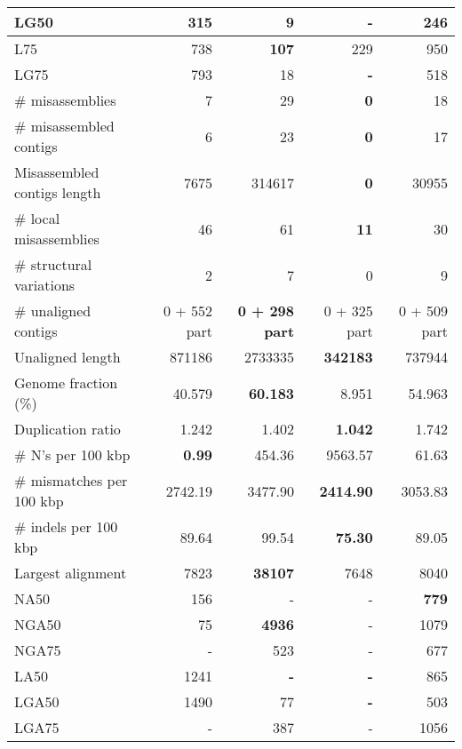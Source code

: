 \documentclass[12pt,a4paper]{article}
\begin{document}
\begin{table}[ht]
\begin{center}
\begin{tabular}{|l*{4}{|r}|}
LG50 & 315 & 9 & {\bf -} & 246 \\ \hline
L75 & 738 & {\bf 107} & 229 & 950 \\ \hline
LG75 & 793 & 18 & {\bf -} & 518 \\ \hline
\# misassemblies & 7 & 29 & {\bf 0} & 18 \\ \hline
\# misassembled contigs & 6 & 23 & {\bf 0} & 17 \\ \hline
Misassembled contigs length & 7675 & 314617 & {\bf 0} & 30955 \\ \hline
\# local misassemblies & 46 & 61 & {\bf 11} & 30 \\ \hline
\# structural variations & 2 & 7 & 0 & 9 \\ \hline
\# unaligned contigs & 0 + 552 part & {\bf 0 + 298 part} & 0 + 325 part & 0 + 509 part \\ \hline
Unaligned length & 871186 & 2733335 & {\bf 342183} & 737944 \\ \hline
Genome fraction (\%) & 40.579 & {\bf 60.183} & 8.951 & 54.963 \\ \hline
Duplication ratio & 1.242 & 1.402 & {\bf 1.042} & 1.742 \\ \hline
\# N's per 100 kbp & {\bf 0.99} & 454.36 & 9563.57 & 61.63 \\ \hline
\# mismatches per 100 kbp & 2742.19 & 3477.90 & {\bf 2414.90} & 3053.83 \\ \hline
\# indels per 100 kbp & 89.64 & 99.54 & {\bf 75.30} & 89.05 \\ \hline
Largest alignment & 7823 & {\bf 38107} & 7648 & 8040 \\ \hline
NA50 & 156 & - & - & {\bf 779} \\ \hline
NGA50 & 75 & {\bf 4936} & - & 1079 \\ \hline
NGA75 & - & 523 & - & 677 \\ \hline
LA50 & 1241 & {\bf -} & {\bf -} & 865 \\ \hline
LGA50 & 1490 & 77 & {\bf -} & 503 \\ \hline
LGA75 & - & 387 & - & 1056 \\ \hline
\end{tabular}
\end{center}
\end{table}
\end{document}
